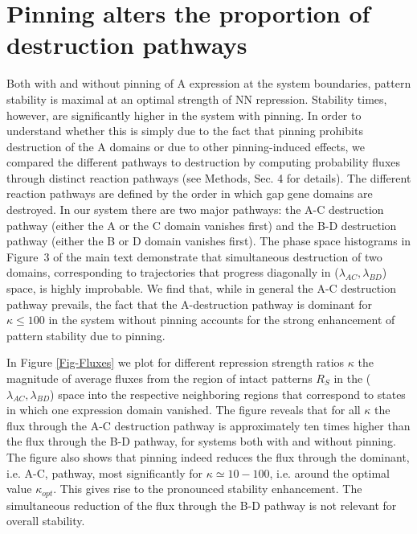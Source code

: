 \documentclass[10pt]{article}
\newcommand{\GA}{A\xspace}
\newcommand{\GB}{B\xspace}
\newcommand{\GC}{C\xspace}
\newcommand{\GD}{D\xspace}
\newcommand{\MM}{Methods, Sec. 4\xspace}
\begin{document}
\section{Pinning alters the proportion of destruction pathways}

Both with and without pinning of \GA expression at the system boundaries, pattern 
stability is maximal at an optimal strength of NN repression.
Stability times, however, are significantly higher in the system with pinning.
In order to understand whether this is simply due to the fact that pinning prohibits destruction of the \GA domains or 
due to other pinning-induced effects, we compared the different pathways to destruction by computing 
probability fluxes through distinct reaction pathways (see \MM for details).
The different reaction pathways are defined by the order in which gap gene domains are destroyed.
In our system there are two major pathways: the \GA-\GC destruction pathway (either the \GA or the \GC domain vanishes first) 
and the \GB-\GD destruction pathway (either the \GB or \GD domain vanishes first).
The phase space histograms in Figure~3 of the main text demonstrate that simultaneous destruction of two domains,
corresponding to trajectories that progress diagonally in ($\lambda_{AC},\lambda_{BD}$) space, is highly improbable.
We find that, while in general the \GA-\GC destruction pathway prevails, 
the fact that the \GA-destruction pathway is dominant for $\kappa\leq100$ in the system without pinning 
accounts for the strong enhancement of pattern stability due to pinning.

In Figure \ref{Fig-Fluxes} we plot for different repression strength ratios $\kappa$
the magnitude of average fluxes from the region of intact patterns $R_S$ in the ($\lambda_{AC},\lambda_{BD}$) space 
into the respective neighboring regions that correspond to states in which one expression domain vanished.
The figure reveals that for all $\kappa$ the flux through the \GA-\GC destruction pathway is approximately 
ten times higher than the flux through the \GB-\GD pathway, for systems both with and without pinning.
The figure also shows that pinning indeed reduces the flux through the dominant, 
i.e. \GA-\GC, pathway, most significantly for $\kappa\simeq 10-100$, i.e. around the optimal value $\kappa_{opt}$. 
This gives rise to the pronounced stability enhancement.
The simultaneous reduction of the flux through the \GB-\GD pathway is not relevant for overall stability.
\end{document}
